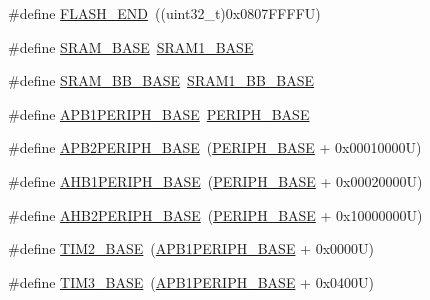 \begin{DoxyCompactItemize}
\item 
\#define \hyperlink{group___peripheral__memory__map_ga8be554f354e5aa65370f6db63d4f3ee4}{F\+L\+A\+S\+H\+\_\+\+E\+ND}~((uint32\+\_\+t)0x0807\+F\+F\+F\+F\+U)
\item 
\#define \hyperlink{group___peripheral__memory__map_ga05e8f3d2e5868754a7cd88614955aecc}{S\+R\+A\+M\+\_\+\+B\+A\+SE}~\hyperlink{group___peripheral__memory__map_ga7d0fbfb8894012dbbb96754b95e562cd}{S\+R\+A\+M1\+\_\+\+B\+A\+SE}
\item 
\#define \hyperlink{group___peripheral__memory__map_gad3548b6e2f017f39d399358f3ac98454}{S\+R\+A\+M\+\_\+\+B\+B\+\_\+\+B\+A\+SE}~\hyperlink{group___peripheral__memory__map_gac4c4f61082e4b168f29d9cf97dc3ca5c}{S\+R\+A\+M1\+\_\+\+B\+B\+\_\+\+B\+A\+SE}
\item 
\#define \hyperlink{group___peripheral__memory__map_ga45666d911f39addd4c8c0a0ac3388cfb}{A\+P\+B1\+P\+E\+R\+I\+P\+H\+\_\+\+B\+A\+SE}~\hyperlink{group___peripheral__memory__map_ga9171f49478fa86d932f89e78e73b88b0}{P\+E\+R\+I\+P\+H\+\_\+\+B\+A\+SE}
\item 
\#define \hyperlink{group___peripheral__memory__map_ga25b99d6065f1c8f751e78f43ade652cb}{A\+P\+B2\+P\+E\+R\+I\+P\+H\+\_\+\+B\+A\+SE}~(\hyperlink{group___peripheral__memory__map_ga9171f49478fa86d932f89e78e73b88b0}{P\+E\+R\+I\+P\+H\+\_\+\+B\+A\+SE} + 0x00010000\+U)
\item 
\#define \hyperlink{group___peripheral__memory__map_ga811a9a4ca17f0a50354a9169541d56c4}{A\+H\+B1\+P\+E\+R\+I\+P\+H\+\_\+\+B\+A\+SE}~(\hyperlink{group___peripheral__memory__map_ga9171f49478fa86d932f89e78e73b88b0}{P\+E\+R\+I\+P\+H\+\_\+\+B\+A\+SE} + 0x00020000\+U)
\item 
\#define \hyperlink{group___peripheral__memory__map_gaeedaa71d22a1948492365e2cd26cfd46}{A\+H\+B2\+P\+E\+R\+I\+P\+H\+\_\+\+B\+A\+SE}~(\hyperlink{group___peripheral__memory__map_ga9171f49478fa86d932f89e78e73b88b0}{P\+E\+R\+I\+P\+H\+\_\+\+B\+A\+SE} + 0x10000000\+U)
\item 
\#define \hyperlink{group___peripheral__memory__map_ga00d0fe6ad532ab32f0f81cafca8d3aa5}{T\+I\+M2\+\_\+\+B\+A\+SE}~(\hyperlink{group___peripheral__memory__map_ga45666d911f39addd4c8c0a0ac3388cfb}{A\+P\+B1\+P\+E\+R\+I\+P\+H\+\_\+\+B\+A\+SE} + 0x0000\+U)
\item 
\#define \hyperlink{group___peripheral__memory__map_gaf0c34a518f87e1e505cd2332e989564a}{T\+I\+M3\+\_\+\+B\+A\+SE}~(\hyperlink{group___peripheral__memory__map_ga45666d911f39addd4c8c0a0ac3388cfb}{A\+P\+B1\+P\+E\+R\+I\+P\+H\+\_\+\+B\+A\+SE} + 0x0400\+U)
\item 

\end{DoxyCompactItemize}
